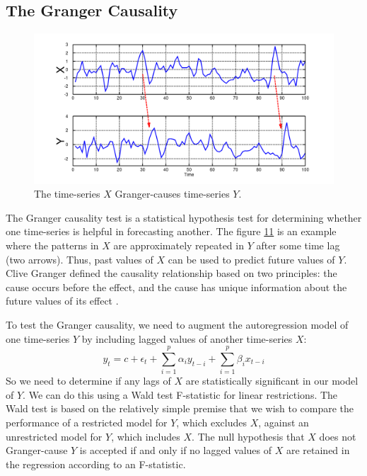 \subsection{The Granger Causality}
\begin{figure}[ht]
\centering
    \label{fig:granger}
    \includegraphics[width=\textwidth]{figures/granger.png}
    \caption{The time-series $X$ Granger-causes time-series $Y$.}
\end{figure}

The Granger causality test is a statistical hypothesis test for determining whether one time-series is helpful in forecasting another. The figure \hyperref[fig:fb-example]{11} is an example where the patterns in $X$ are approximately repeated in $Y$ after some time lag (two arrows). Thus, past values of $X$ can be used to predict future values of $Y$. Clive Granger defined the causality relationship based on two principles: the cause occurs before the effect, and the cause has unique information about the future values of its effect \cite{granger1980testing}.\newline

To test the Granger causality, we need to augment the autoregression model of one time-series $Y$ by including lagged values of another time-series $X$: 
\begin{equation}
y_{t}=c+\epsilon_{t}+\sum_{i=1}^{p} \alpha_{i} y_{t-i}+\sum_{i=1}^{p} \beta_{i} x_{t-i}
\end{equation}
So we need to determine if any lags of $X$ are statistically significant in our model of $Y$. We can do this using a Wald test F-statistic for linear restrictions. The Wald test is based on the relatively simple premise that we wish to compare the performance of a restricted model for $Y$, which excludes $X$, against an unrestricted model for $Y$, which includes $X$. The null hypothesis that $X$ does not Granger-cause $Y$ is accepted if and only if no lagged values of $X$ are retained in the regression according to an F-statistic.\newline

